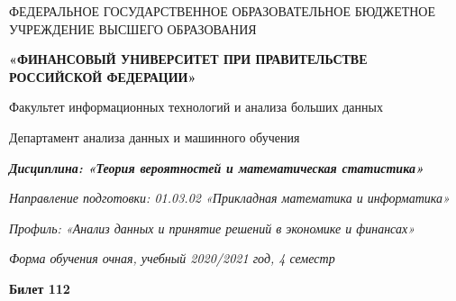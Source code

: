 \documentclass[a4paper,10pt]{article}
\begin{document}
\begin{center}
ФЕДЕРАЛЬНОЕ ГОСУДАРСТВЕННОЕ ОБРАЗОВАТЕЛЬНОЕ БЮДЖЕТНОЕ УЧРЕЖДЕНИЕ ВЫСШЕГО ОБРАЗОВАНИЯ

    \textbf{«ФИНАНСОВЫЙ УНИВЕРСИТЕТ ПРИ ПРАВИТЕЛЬСТВЕ РОССИЙСКОЙ ФЕДЕРАЦИИ»}

Факультет информационных технологий и анализа больших данных

Департамент анализа данных и машинного обучения

\textit{
	\textbf{Дисциплина: «Теория вероятностей и математическая статистика»}}

\textit{Направление подготовки: 01.03.02 «Прикладная математика и информатика»}

\textit{Профиль: «Анализ данных и принятие решений в экономике и финансах»}

\textit{Форма обучения очная, учебный 2020/2021 год, 4 семестр}

\textbf{Билет 112}

\end{center}
\end{document}
